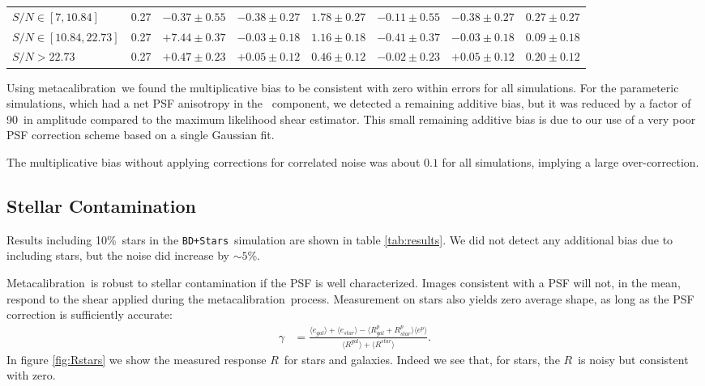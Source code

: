 \documentclass[usegraphicx,usenatbib]{mn2e}
\newcommand{\snr}{$S/N$}
\newcommand{\mest}{e}
\newcommand{\mcal}{metacalibration}
\newcommand{\Mcal}{Metacalibration}
\newcommand{\mcalR}{$R$}
\newcommand{\nsimNStar}{$12 \times 10^7$}
\newcommand{\nsimNstarperc}{10\%}
\newcommand{\bdsim}{\texttt{BD}}
\newcommand{\bdstar}{\texttt{BD+Stars}}
\newcommand{\pimprovement}{90}
\begin{document}
\begin{table}
\begin{tabular}{ |l| |c| c|c|c|  c|c|c|}
        $\mbox{\snr} \in [7, 10.84]$      & 0.27     & $-0.37 \pm 0.55$ & $-0.38 \pm 0.27$ & $1.78 \pm 0.27$  & $-0.11 \pm 0.55$  & $-0.38 \pm 0.27$ & $0.27 \pm 0.27$  \\
        $\mbox{\snr} \in [10.84, 22.73]$  & 0.27     & $+7.44 \pm 0.37$ & $-0.03 \pm 0.18$ & $1.16 \pm 0.18$  & $-0.41 \pm 0.37$  & $-0.03 \pm 0.18$ & $0.09 \pm 0.18$  \\
        $\mbox{\snr} > 22.73$          & 0.27     & $+0.47 \pm 0.23$ & $+0.05 \pm 0.12$ & $0.46 \pm 0.12$  & $-0.02 \pm 0.23$  & $+0.05 \pm 0.12$ & $0.20 \pm 0.12$  \\


    \end{tabular}
\end{table}


Using \mcal\ we found the multiplicative bias to be consistent with zero within
errors for all simulations. For the parameteric simulations, which had a
net PSF anisotropy in the \etwo\ component, we detected a remaining
additive bias, but it was reduced by a factor of \pimprovement\ in amplitude
compared to the maximum likelihood shear estimator.  This small remaining
additive bias is due to our use of a very poor PSF correction scheme based
on a single Gaussian fit.

The multiplicative bias without applying corrections for correlated noise
was about $0.1$ for all simulations, implying a large over-correction.


\subsection{Stellar Contamination} \label{sec:stars}

Results including \nsimNstarperc\ stars in the \bdstar\ simulation are shown in
table \ref{tab:results}. We did not detect any additional bias due to including
stars, but the noise did increase by $\sim 5$\%.


\Mcal\ is robust to stellar contamination if the PSF is well
characterized.  Images consistent with a PSF will not, in the mean, respond to the shear
applied during the \mcal\ process.  Measurement on stars also yields zero average shape, as
long as the PSF correction is sufficiently accurate:
\begin{align}
    \gamma &= \frac{ \langle \mest_{gal} \rangle + \langle \mest_{star} \rangle - \langle R^p_{gal} + R^p_{star} \rangle \langle \mest^p \rangle }{ \langle R^{gal} \rangle + \langle R^{star} \rangle}.
\end{align}
In figure \ref{fig:Rstars} we show the measured response \mcalR\ for stars
and galaxies.  Indeed we see that, for stars, the \mcalR\ is noisy but consistent with
zero.
\end{document}
